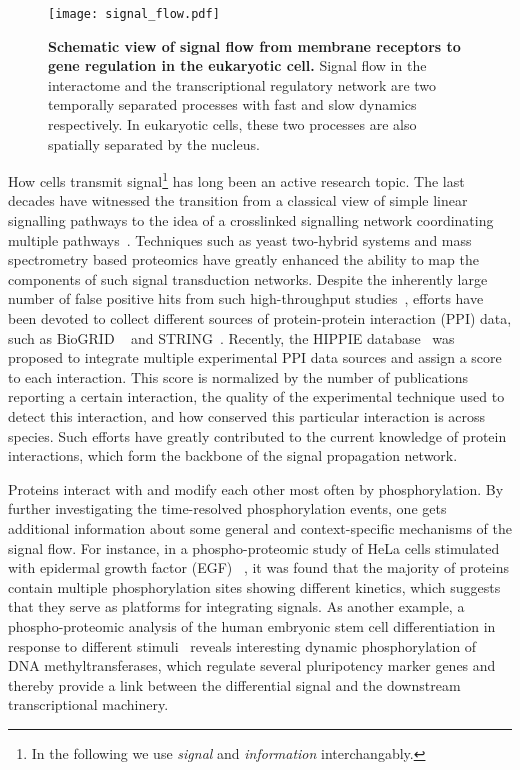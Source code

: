 \begin{figure}[!ht]
\begin{center}
\texttt{[image: signal\_flow.pdf]}
\end{center}
\caption[Signal flow]{{\bf Schematic view of signal flow from membrane 
receptors to gene regulation in the eukaryotic cell.}
Signal flow in the interactome and the transcriptional 
regulatory network are two temporally separated processes 
with
fast and slow dynamics respectively. In eukaryotic cells,
these two processes are also spatially separated by the
nucleus.
}
\label{fig:signal_flow}
\end{figure}

How cells transmit signal\footnote{In the following we
use \emph{signal} and \emph{information} interchangably.} 
has long been an active research topic.
The last decades have witnessed the transition from a classical view of 
simple linear signalling pathways
to the idea of a crosslinked signalling network coordinating multiple 
pathways~\citep{Kholodenko2012}. Techniques such as yeast two-hybrid systems 
and mass spectrometry based
proteomics have greatly enhanced the ability to map the components of such 
signal transduction networks. Despite the inherently large number of false
positive hits from such high-throughput studies~\citep{Mering2002a}, 
efforts have been devoted
to collect different sources of protein-protein interaction 
(PPI) data, such as BioGRID%
~\citep{Stark2006} and STRING~\citep{Szklarczyk2011}. Recently, the HIPPIE
database~\citep{Schaefer2012} was proposed to integrate multiple experimental PPI
data sources and assign a score to each interaction. This
score is normalized by the number of publications reporting 
a certain
interaction, the quality of the experimental technique used
to detect this interaction, and how conserved this particular
interaction is across species. Such efforts have greatly 
contributed to the current knowledge of protein interactions,
which form the backbone of the signal propagation network.

Proteins interact with and modify each other most often by phosphorylation.
By further investigating the time-resolved phosphorylation
events, one gets additional information about some general
and context-specific mechanisms of the signal flow.
For instance, in a phospho-proteomic study of 
HeLa cells stimulated with epidermal growth factor (EGF)~%
\citep{Olsen2006},
it was found that the majority of proteins contain multiple 
phosphorylation sites showing different kinetics, which 
suggests that they serve as platforms for integrating 
signals. As another example, a phospho-proteomic analysis
of the human embryonic stem cell differentiation in response
to different stimuli~\citep{Rigbolt2011} reveals interesting
dynamic phosphorylation of DNA methyltransferases, which
regulate several pluripotency marker genes and thereby 
provide a link between the differential signal and the
downstream transcriptional machinery.

